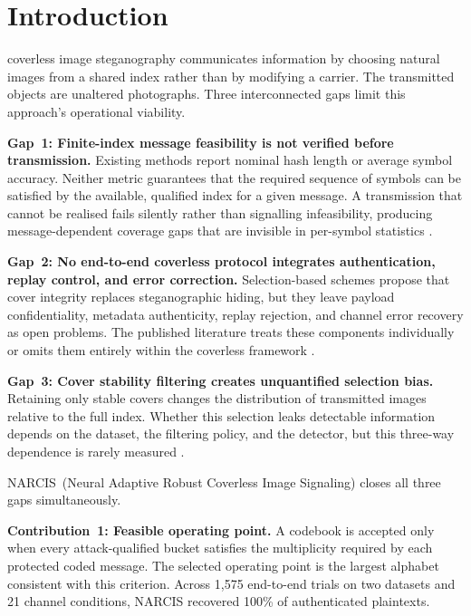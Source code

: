 \documentclass[10pt,journal]{IEEEtran}
\newcommand{\method}{NARCIS\xspace}
\begin{document}
\section{Introduction}
\label{sec:introduction}

 coverless image steganography
communicates information by choosing natural images from a shared
index rather than by modifying a carrier. The transmitted objects are
unaltered photographs. Three interconnected gaps limit this approach's
operational viability.

\textbf{Gap~1: Finite-index message feasibility is not verified before
transmission.} Existing methods report nominal hash length or average
symbol accuracy. Neither metric guarantees that the required sequence
of symbols can be satisfied by the available, qualified index for a
given message. A transmission that cannot be realised fails silently
rather than signalling infeasibility, producing message-dependent
coverage gaps that are invisible in per-symbol statistics
\cite{zhou2015coverless,meng2024review}.

\textbf{Gap~2: No end-to-end coverless protocol integrates
authentication, replay control, and error correction.} Selection-based
schemes propose that cover integrity replaces steganographic hiding, but
they leave payload confidentiality, metadata authenticity, replay
rejection, and channel error recovery as open problems. The published
literature treats these components individually or omits them entirely
within the coverless framework \cite{zheng2017hashing,li2024surf,
guo2025diverse,guo2026capacity}.

\textbf{Gap~3: Cover stability filtering creates unquantified selection
bias.} Retaining only stable covers changes the distribution of
transmitted images relative to the full index. Whether this selection
leaks detectable information depends on the dataset, the filtering
policy, and the detector, but this three-way dependence is rarely
measured \cite{fridrich2012rich,cachin1998steganography}.

\method~(Neural Adaptive Robust Coverless Image Signaling) closes all
three gaps simultaneously.

\textbf{Contribution~1: Feasible operating point.} A codebook is
accepted only when every attack-qualified bucket satisfies the
multiplicity required by each protected coded message. The selected
operating point is the largest alphabet consistent with this criterion.
Across 1{,}575 end-to-end trials on two datasets and 21 channel
conditions, \method recovered 100\% of authenticated plaintexts.
\end{document}
